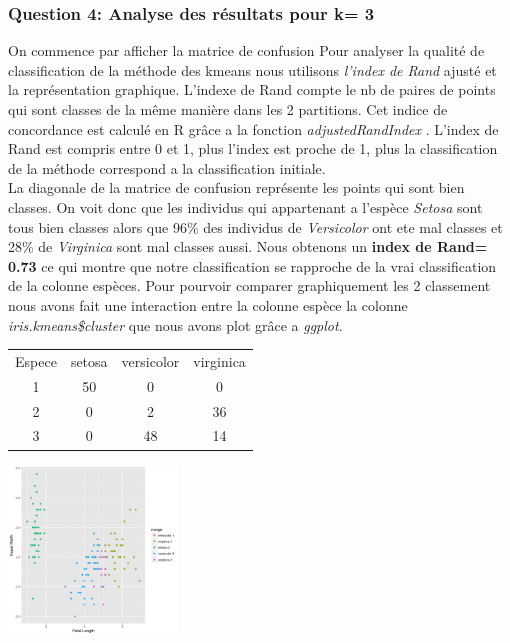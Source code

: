 \documentclass[10pt]{article}
\begin{document}
 \subsubsection{ Question 4: Analyse des résultats pour k= 3}
On commence par afficher la matrice de confusion
Pour analyser la qualité de classification de la méthode des kmeans nous utilisons\textit{ l'index de Rand} ajusté et la représentation graphique. L'indexe de Rand compte le nb de paires de points qui sont classes de la même manière dans les 2 partitions. Cet indice de concordance est calculé en R grâce a la fonction \textit{adjustedRandIndex} . L'index de Rand est compris entre 0 et 1, plus l'index est proche de 1, plus la classification de la méthode correspond a la classification initiale.\\


La diagonale de la matrice de confusion représente les points qui sont bien classes. On voit donc que les individus qui appartenant a l'espèce \textit{Setosa} sont tous bien classes alors que 96\% des individus de \textit{Versicolor} ont ete mal classes et 28\% de \textit{Virginica} sont mal classes aussi.  Nous obtenons un \textbf{index de Rand= 0.73 } ce qui montre que notre classification se rapproche de la vrai classification de la colonne espèces.
Pour pourvoir comparer graphiquement les 2 classement nous avons fait une interaction entre la colonne espèce la colonne \textit{iris.kmeans\$cluster} que nous avons plot grâce a \textit{ggplot}. 

	\begin{minipage}{.5\textwidth}
		\begin{tabular}{c c c c}	
			Espece &setosa & versicolor & virginica\\
			1     &  50     &     0    &     0\\
			2     & 0       &   2      &  36\\
			3     & 0    &     48   &     14
		\end{tabular}
\end{minipage}%
\hspace{0.08\linewidth}
\begin{minipage}{.5\textwidth}
	\includegraphics[width=45mm]{Figures/Iris_2/interaction.png}
	\label{fig:interaction}
\end{minipage}
\vspace{0.1mm}\\
\end{document}
